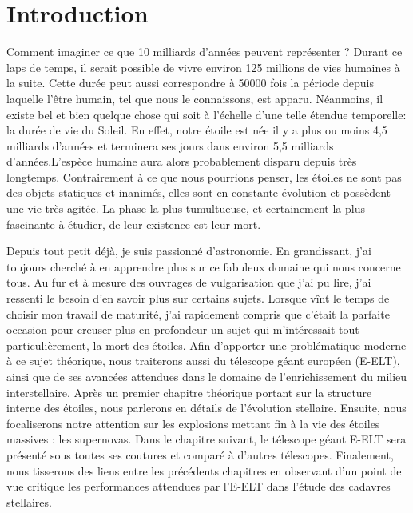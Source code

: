 

\chapter*{Introduction}


\vfill

Comment imaginer ce que 10 milliards d'années peuvent représenter ? Durant ce laps de temps, il serait possible de vivre environ 125 millions de vies humaines à la suite. Cette durée peut aussi correspondre à 50000 fois la période depuis laquelle l'être humain, tel que nous le connaissons, est apparu. Néanmoins, il existe bel et bien quelque chose qui soit à l'échelle d'une telle étendue temporelle: la durée de vie du Soleil. En effet, notre étoile est née il y a plus ou moins 4,5 milliards d'années et terminera ses jours dans environ 5,5 milliards d'années.L'espèce humaine aura alors probablement disparu depuis très longtemps. Contrairement à ce que nous pourrions penser, les étoiles ne sont pas des objets statiques et inanimés, elles sont en constante évolution et possèdent une vie très agitée. La phase la plus tumultueuse, et certainement la plus fascinante à étudier, de leur existence est leur mort.\smallskip

 Depuis tout petit déjà, je suis passionné d'astronomie. En grandissant, j'ai toujours cherché à en apprendre plus sur ce fabuleux domaine qui nous concerne tous. Au fur et à mesure des ouvrages de vulgarisation que j'ai pu lire, j'ai ressenti le besoin d'en savoir plus sur certains sujets. Lorsque vînt le temps de choisir mon travail de maturité, j'ai rapidement compris que c'était la parfaite occasion pour creuser plus en profondeur un sujet qui m'intéressait tout particulièrement, la mort des étoiles. Afin d'apporter une problématique moderne à ce sujet théorique, nous traiterons aussi du télescope géant européen (E-ELT), ainsi que de ses avancées attendues dans le domaine de l'enrichissement du milieu interstellaire. Après un premier chapitre théorique portant sur la structure interne des étoiles, nous parlerons en détails de l'évolution stellaire. Ensuite, nous focaliserons notre attention sur les explosions mettant fin à la vie des étoiles massives : les supernovas. Dans le chapitre suivant, le télescope géant E-ELT sera présenté sous toutes ses coutures et comparé à d'autres télescopes. Finalement, nous tisserons des liens entre les précédents chapitres en observant d'un point de vue critique les performances attendues par l'E-ELT dans l'étude des cadavres stellaires. 

\vfill
